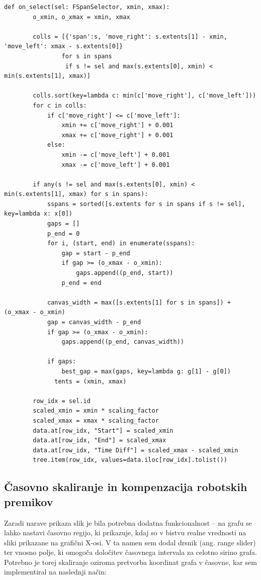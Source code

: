 \documentclass[a4paper,12pt]{article}
\begin{document}
\begin{lstlisting}[caption={Funkcija za izbiro območij na grafu}, label={lst:onselect}]
def on_select(sel: FSpanSelector, xmin, xmax):
        o_xmin, o_xmax = xmin, xmax
        
        colls = [{'span':s, 'move_right': s.extents[1] - xmin, 'move_left': xmax - s.extents[0]}  
                for s in spans 
                 if s != sel and max(s.extents[0], xmin) < min(s.extents[1], xmax)]
    
        colls.sort(key=lambda c: min(c['move_right'], c['move_left']))
        for c in colls:
            if c['move_right'] <= c['move_left']:
                xmin += c['move_right'] + 0.001
                xmax += c['move_right'] + 0.001
            else:
                xmin -= c['move_left'] + 0.001
                xmax -= c['move_left'] + 0.001
    
        if any(s != sel and max(s.extents[0], xmin) < min(s.extents[1], xmax) for s in spans):
            sspans = sorted([s.extents for s in spans if s != sel], key=lambda x: x[0])
            gaps = []
            p_end = 0
            for i, (start, end) in enumerate(sspans):
                gap = start - p_end
                if gap >= (o_xmax - o_xmin):
                    gaps.append((p_end, start))
                p_end = end
            
            canvas_width = max([s.extents[1] for s in spans]) + (o_xmax - o_xmin)
            gap = canvas_width - p_end
            if gap >= (o_xmax - o_xmin):
                gaps.append((p_end, canvas_width))
            
            if gaps:
                best_gap = max(gaps, key=lambda g: g[1] - g[0])
              tents = (xmin, xmax)
        
        row_idx = sel.id
        scaled_xmin = xmin * scaling_factor
        scaled_xmax = xmax * scaling_factor
        data.at[row_idx, "Start"] = scaled_xmin
        data.at[row_idx, "End"] = scaled_xmax
        data.at[row_idx, "Time Diff"] = scaled_xmax - scaled_xmin
        tree.item(row_idx, values=data.iloc[row_idx].tolist())
\end{lstlisting}

\subsection{Časovno skaliranje in kompenzacija robotskih premikov}

Zaradi narave prikaza slik je bila potrebna dodatna funkcionalnost – na grafu se lahko nastavi časovno regijo, ki prikazuje, kdaj so v bistvu realne vrednosti na sliki prikazane na grafični X-osi. V ta namen sem dodal drsnik (ang. range slider) ter vnosno polje, ki omogoča določitev časovnega intervala za celotno sirino grafa. Potrebno je torej skaliranje oziroma pretvorba koordinat grafa v časovne, kar sem implementiral na naslednji način:
\end{document}
